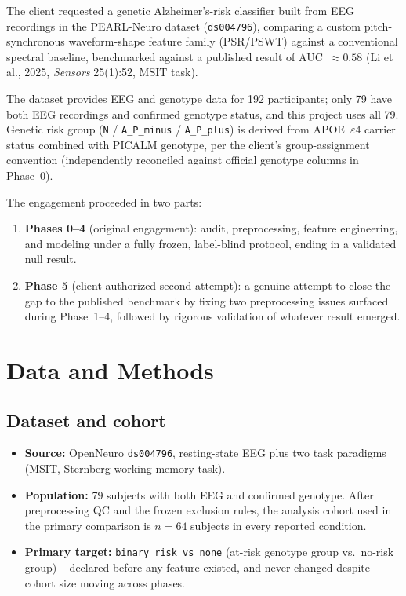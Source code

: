 \documentclass[11pt]{article}
\begin{document}
The client requested a genetic Alzheimer's-risk classifier built from EEG
recordings in the PEARL-Neuro dataset (\texttt{ds004796}), comparing a
custom pitch-synchronous waveform-shape feature family (PSR/PSWT) against
a conventional spectral baseline, benchmarked against a published result
of AUC~$\approx 0.58$ (Li et al., 2025, \textit{Sensors} 25(1):52, MSIT
task).

The dataset provides EEG and genotype data for 192 participants; only 79
have both EEG recordings and confirmed genotype status, and this project
uses all 79. Genetic risk group (\texttt{N} / \texttt{A\_P\_minus} /
\texttt{A\_P\_plus}) is derived from APOE~$\varepsilon4$ carrier status
combined with PICALM genotype, per the client's group-assignment
convention (independently reconciled against official genotype columns in
Phase~0).

The engagement proceeded in two parts:

\begin{enumerate}[label=\textbf{Part \arabic*.}, leftmargin=2.2cm]
  \item \textbf{Phases 0--4} (original engagement): audit, preprocessing,
        feature engineering, and modeling under a fully frozen,
        label-blind protocol, ending in a validated null result.
  \item \textbf{Phase 5} (client-authorized second attempt): a genuine
        attempt to close the gap to the published benchmark by fixing
        two preprocessing issues surfaced during Phase~1--4, followed by
        rigorous validation of whatever result emerged.
\end{enumerate}

\section{Data and Methods}

\subsection{Dataset and cohort}

\begin{itemize}[leftmargin=1.2cm]
  \item \textbf{Source:} OpenNeuro \texttt{ds004796}, resting-state EEG
        plus two task paradigms (MSIT, Sternberg working-memory task).
  \item \textbf{Population:} 79 subjects with both EEG and confirmed
        genotype. After preprocessing QC and the frozen exclusion rules,
        the analysis cohort used in the primary comparison is
        $n=64$ subjects in every reported condition.
  \item \textbf{Primary target:} \texttt{binary\_risk\_vs\_none}
        (at-risk genotype group vs.\ no-risk group) -- declared before any
        feature existed, and never changed despite cohort size moving
        across phases.
\end{itemize}
\end{document}
